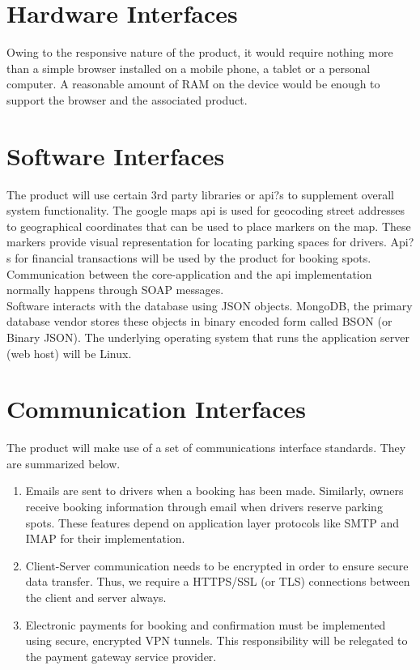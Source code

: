 \documentclass[12pt,a4paper]{report}
\begin{document}
\section{Hardware Interfaces}
Owing to the responsive nature of the product, it would require nothing more than a simple browser installed on a mobile phone, a tablet or a personal computer. A reasonable amount of RAM on the device would be enough to support the browser and the associated product. \cite{parking_marketplace_srs}
\section{Software Interfaces}
The product will use certain 3rd party libraries or api?s to supplement overall system functionality. The google maps api is used for geocoding street addresses to geographical coordinates that can be used to place markers on the map. These markers provide visual representation for locating parking spaces for drivers. Api?s for financial transactions will be used by the product for booking spots. Communication between the core-application and the api implementation normally happens through SOAP messages.  \\
Software interacts with the database using JSON objects. MongoDB, the primary database vendor stores these objects in binary encoded form called BSON (or Binary JSON). The underlying operating system that runs the application server (web host) will be Linux. \cite{parking_marketplace_srs}
\section{Communication Interfaces}
The product will make use of a set of communications interface standards. They are summarized below. \cite{parking_marketplace_srs}
\begin{enumerate}
	\renewcommand{\labelenumi}{{\textbf{\arabic{enumi}.}}}
	\item Emails are sent to drivers when a booking has been made. Similarly, owners receive booking information through email when drivers reserve parking spots. These features depend on application layer protocols like SMTP and IMAP for their implementation.
	\item Client-Server communication needs to be encrypted in order to ensure secure data transfer. Thus, we require a HTTPS/SSL (or TLS) connections between the client and server always.
	\item Electronic payments for booking and confirmation must be implemented using secure, encrypted VPN tunnels. This responsibility will be relegated to the payment gateway service provider.  
\end{enumerate}
\end{document}
